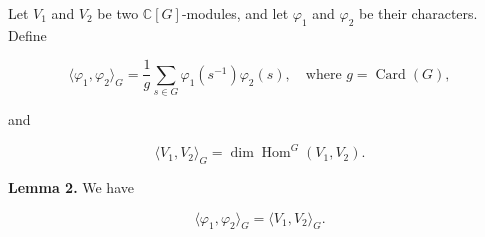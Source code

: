 Let $V_1$ and $V_2$ be two $\mathbb{C}[G]$-modules, and let $\varphi_1$ and $\varphi_2$ be their characters. Define

$$\langle \varphi_1, \varphi_2 \rangle_G = \frac{1}{g} \sum_{s \in G} \varphi_1(s^{-1})\varphi_2(s), \quad \text{where } g = \operatorname{Card}(G),$$

and

$$\langle V_1, V_2 \rangle_G = \dim \operatorname{Hom}^G(V_1, V_2).$$

\textbf{Lemma 2.} We have

$$\langle \varphi_1, \varphi_2 \rangle_G = \langle V_1, V_2 \rangle_G.$$

